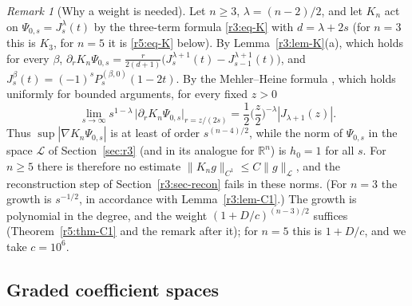 \documentclass[11pt]{amsart}
\theoremstyle{definition}
\theoremstyle{remark}
\newtheorem{remark}[theorem]{Remark}
\numberwithin{equation}{section}
\newcommand{\R}{\mathbb{R}}
\newcommand{\nrm}[1]{\lVert #1\rVert}
\begin{document}
\begin{remark}[Why a weight is needed]\label{r5:rem-obstruction}
Let $n\geq3$, $\lambda=(n-2)/2$, and let $K_n$ act on $\Psi_{0,s}=J^\lambda_s(t)$ by the three-term formula \eqref{r3:eq-K} with $d=\lambda+2s$ (for $n=3$ this is $K_3$, for $n=5$ it is \eqref{r5:eq-K} below). By Lemma~\ref{r3:lem-K}(a), which holds for every $\beta$, $\partial_rK_n\Psi_{0,s}=\frac r{2(d+1)}\big(J^{\lambda+1}_s(t)-J^{\lambda+1}_{s-1}(t)\big)$, and $J^\beta_s(t)=(-1)^sP^{(\beta,0)}_s(1-2t)$. By the Mehler--Heine formula \cite[18.11.5]{DLMF}, which holds uniformly for bounded arguments, for every fixed $z>0$
\[
\lim_{s\to\infty}s^{1-\lambda}\,\Big|\partial_rK_n\Psi_{0,s}\Big|_{r=z/(2s)}=\frac12\Big(\frac z2\Big)^{-\lambda}|J_{\lambda+1}(z)| .
\]
Thus $\sup|\nabla K_n\Psi_{0,s}|$ is at least of order $s^{(n-4)/2}$, while the norm of $\Psi_{0,s}$ in the space $\mathcal L$ of Section~\ref{sec:r3} (and in its analogue for $\R^n$) is $h_0=1$ for all $s$. For $n\geq5$ there is therefore no estimate $\nrm{K_ng}_{C^1}\leq C\nrm g_{\mathcal L}$, and the reconstruction step of Section~\ref{r3:sec-recon} fails in these norms. (For $n=3$ the growth is $s^{-1/2}$, in accordance with Lemma~\ref{r3:lem-C1}.) The growth is polynomial in the degree, and the weight $(1+D/c)^{(n-3)/2}$ suffices (Theorem~\ref{r5:thm-C1} and the remark after it); for $n=5$ this is $1+D/c$, and we take $c=10^6$.
\end{remark}

\subsection{Graded coefficient spaces}\label{r5:sec-spaces}
\end{document}
